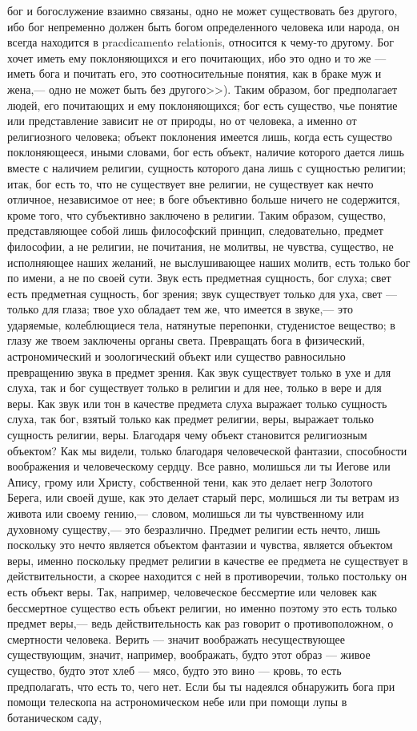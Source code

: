 \documentclass[12pt]{article}
\begin{document}
бог и богослужение взаимно связаны, одно не может существовать без другого, ибо бог непременно должен быть богом определенного человека или народа, он всегда находится в pracdicamento relationis, относится к чему-то другому. Бог хочет иметь ему поклоняющихся и его почитающих, ибо это одно и то же --- иметь бога и почитать его, это соотносительные понятия, как в браке муж и жена,--- одно не может быть без другого>>). Таким образом, бог предполагает людей, его почитающих и ему поклоняющихся; бог есть существо, чье понятие или представление зависит не от природы, но от человека, а именно от религиозного человека; объект поклонения имеется лишь, когда есть существо поклоняющееся, иными словами, бог есть объект, наличие которого дается лишь вместе с наличием религии, сущность которого дана лишь с сущностью религии; итак, бог есть то, что не существует вне религии, не существует как нечто отличное, независимое от нее; в боге объективно больше ничего не содержится, кроме того, что субъективно заключено в религии. Таким образом, существо, представляющее собой лишь философский принцип, следовательно, предмет философии, а не религии, не почитания, не молитвы, не чувства, существо, не исполняющее наших желаний, не выслушивающее наших молитв, есть только бог по имени, а не по своей сути. Звук есть предметная сущность, бог слуха; свет есть предметная сущность, бог зрения; звук существует только для уха, свет --- только для глаза; твое ухо обладает тем же, что имеется в звуке,--- это ударяемые, колеблющиеся тела, натянутые перепонки, студенистое вещество; в глазу же твоем заключены органы света. Превращать бога в физический, астрономический и зоологический объект или существо равносильно превращению звука в предмет зрения. Как звук существует только в ухе и для слуха, так и бог существует только в религии и для нее, только в вере и для веры. Как звук или тон в качестве предмета слуха выражает только сущность слуха, так бог, взятый только как предмет религии, веры, выражает только сущность религии, веры. Благодаря чему объект становится религиозным объектом? Как мы видели, только благодаря человеческой фантазии, способности воображения и человеческому сердцу. Все равно, молишься ли ты Иегове или Апису, грому или Христу, собственной тени, как это делает негр Золотого Берега, или своей душе, как это делает старый перс, молишься ли ты ветрам из живота или своему гению,--- словом, молишься ли ты чувственному или духовному существу,--- это безразлично. Предмет религии есть нечто, лишь поскольку это нечто является объектом фантазии и чувства, является объектом веры, именно поскольку предмет религии в качестве ее предмета не существует в действительности, а скорее находится с ней в противоречии, только постольку он есть объект веры. Так, например, человеческое бессмертие или человек как бессмертное существо есть объект религии, но именно поэтому это есть только предмет веры,--- ведь действительность как раз говорит о противоположном, о смертности человека. Верить --- значит воображать несуществующее существующим, значит, например, воображать, будто этот образ --- живое существо, будто этот хлеб --- мясо, будто это вино --- кровь, то есть предполагать, что есть то, чего нет. Если бы ты надеялся обнаружить бога при помощи телескопа на астрономическом небе или при помощи лупы в ботаническом саду, 
\end{document}

